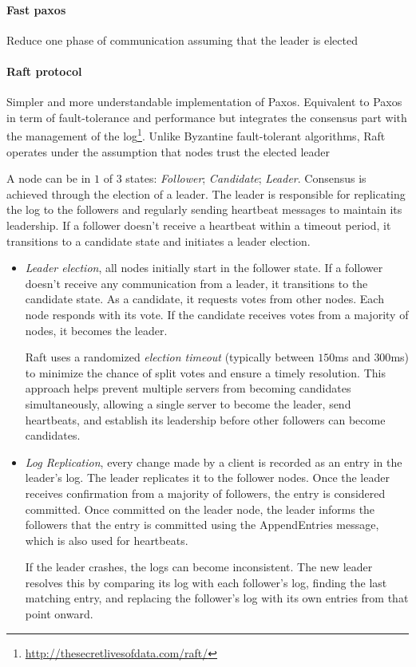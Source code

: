 \paragraph{Fast paxos}
Reduce one phase of communication assuming that the leader is elected

\paragraph{Raft protocol}
Simpler and more understandable implementation of Paxos. Equivalent to Paxos in term of fault-tolerance and performance but integrates the consensus part with the management of the log\footnote{\url{http://thesecretlivesofdata.com/raft/}}. Unlike Byzantine fault-tolerant algorithms, Raft operates under the assumption that nodes trust the elected leader

A node can be in $1$ of $3$ states: \textit{Follower}; \textit{Candidate}; \textit{Leader}. Consensus is achieved through the election of a leader. The leader is responsible for replicating the log to the followers and regularly sending heartbeat messages to maintain its leadership. If a follower doesn't receive a heartbeat within a timeout period, it transitions to a candidate state and initiates a leader election.

\begin{itemize}
    \item \textit{Leader election}, all nodes initially start in the follower state. If a follower doesn't receive any communication from a leader, it transitions to the candidate state. As a candidate, it requests votes from other nodes. Each node responds with its vote. If the candidate receives votes from a majority of nodes, it becomes the leader.

    Raft uses a randomized \textit{election timeout} (typically between $150$ms and $300$ms) to minimize the chance of split votes and ensure a timely resolution. This approach helps prevent multiple servers from becoming candidates simultaneously, allowing a single server to become the leader, send heartbeats, and establish its leadership before other followers can become candidates.

    \item \textit{Log Replication}, every change made by a client is recorded as an entry in the leader's log. The leader replicates it to the follower nodes. Once the leader receives confirmation from a majority of followers, the entry is considered committed. Once committed on the leader node, the leader informs the followers that the entry is committed using the AppendEntries message, which is also used for heartbeats.

    If the leader crashes, the logs can become inconsistent. The new leader resolves this by comparing its log with each follower's log, finding the last matching entry, and replacing the follower's log with its own entries from that point onward.
\end{itemize}

